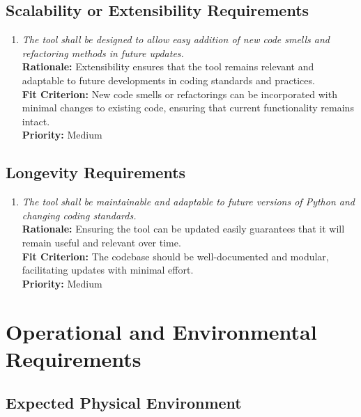 \documentclass[12pt]{article}
\begin{document}
\subsection{Scalability or Extensibility Requirements}
\begin{enumerate}[label=PR-SER \arabic*., wide=0pt, leftmargin=*]
    \item \emph{The tool shall be designed to allow easy addition of new code smells and refactoring methods in future updates.}\\
    {\bf Rationale:} Extensibility ensures that the tool remains relevant and adaptable to future developments in coding standards and practices.\\
    {\bf Fit Criterion:} New code smells or refactorings can be incorporated with minimal changes to existing code, ensuring that current functionality remains intact.\\
    {\bf Priority:} Medium
\end{enumerate}
\subsection{Longevity Requirements}
\begin{enumerate}[label=PR-LR \arabic*., wide=0pt, leftmargin=*]
    \item \emph{The tool shall be maintainable and adaptable to future versions of Python and changing coding standards.}\\
    {\bf Rationale:} Ensuring the tool can be updated easily guarantees that it will remain useful and relevant over time.\\
    {\bf Fit Criterion:} The codebase should be well-documented and modular, facilitating updates with minimal effort.\\
    {\bf Priority:} Medium
\end{enumerate}

\section{Operational and Environmental Requirements}
\subsection{Expected Physical Environment}
\end{document}
